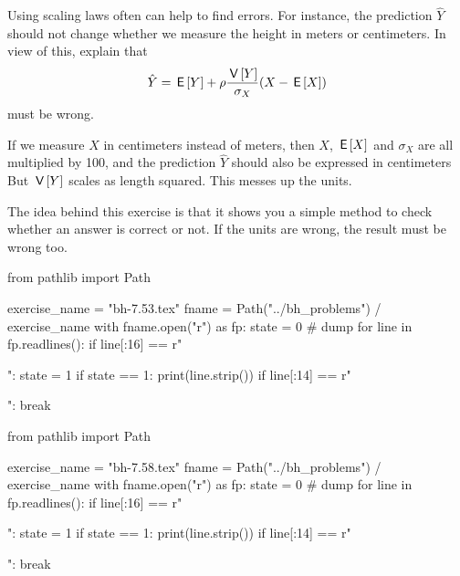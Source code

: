 \begin{exercise}
Using scaling laws often can help to find errors. For instance,  the prediction $\hat Y$ should not change whether we measure the height in meters or centimeters.
In view of this, explain that
\begin{align*}
  \hat Y = \,\mathsf{E}\left[Y\right] + \rho \frac{\,\mathsf{V}\left[Y\right]}{\sigma_X} (X - \,\mathsf{E}\left[X\right])
\end{align*}
must be wrong.
\begin{solution}
  If we measure $X$ in centimeters instead of meters, then $X$, $\,\mathsf{E}\left[X\right]$ and $\sigma_X$ are all multiplied by 100, and the prediction $\hat Y$ should also be expressed in centimeters But $\,\mathsf{V}\left[Y\right] $ scales as length squared.
  This messes up the units.

  The idea behind this exercise is that it shows you a simple method to check whether an answer is correct or not. If the units are wrong, the result must be wrong too.
\end{solution}
\end{exercise}





\begin{pycode}
from pathlib import Path

exercise_name = "bh-7.53.tex"
fname = Path("../bh_problems") / exercise_name
with fname.open("r") as fp:
    state = 0  # dump
    for line in fp.readlines():
        if line[:16] == r"\begin{exercise}":
            state = 1
        if state == 1:
            print(line.strip())
        if line[:14] == r"\end{exercise}":
            break
\end{pycode}


\begin{pycode}
from pathlib import Path

exercise_name = "bh-7.58.tex"
fname = Path("../bh_problems") / exercise_name
with fname.open("r") as fp:
    state = 0  # dump
    for line in fp.readlines():
        if line[:16] == r"\begin{exercise}":
            state = 1
        if state == 1:
            print(line.strip())
        if line[:14] == r"\end{exercise}":
            break
\end{pycode}

